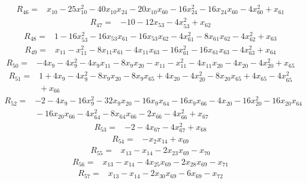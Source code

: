 \begin{align*}
R_{46}={}& x_{10} - 25x_{10}^{2} - 40x_{10}x_{24} - 20x_{10}x_{60} - 16x_{24}^{2} - 16x_{24}x_{60} - 4x_{60}^{2} + x_{61}
\end{align*}
\begin{align*}
R_{47}={}& -10 - 12x_{53} - 4x_{53}^{2} + x_{62}
\end{align*}
\begin{align*}
R_{48}={}& 1 - 16x_{53}^{2} - 16x_{53}x_{61} - 16x_{53}x_{62} - 4x_{61}^{2} - 8x_{61}x_{62} - 4x_{62}^{2} + x_{63}
\end{align*}
\begin{align*}
R_{49}={}& x_{11} - x_{11}^{2} - 8x_{11}x_{61} - 4x_{11}x_{63} - 16x_{61}^{2} - 16x_{61}x_{63} - 4x_{63}^{2} + x_{64}
\end{align*}
\begin{align*}
R_{50}={}& -4x_{9} - 4x_{9}^{2} - 4x_{9}x_{11} - 8x_{9}x_{20} - x_{11} - x_{11}^{2} - 4x_{11}x_{20} - 4x_{20} - 4x_{20}^{2} + x_{65}
\end{align*}
\begin{align*}
R_{51}={}& 1 + 4x_{9} - 4x_{9}^{2} - 8x_{9}x_{20} - 8x_{9}x_{65} + 4x_{20} - 4x_{20}^{2} - 8x_{20}x_{65} + 4x_{65} - 4x_{65}^{2} \\
&{} + x_{66}
\end{align*}
\begin{align*}
R_{52}={}& -2 - 4x_{9} - 16x_{9}^{2} - 32x_{9}x_{20} - 16x_{9}x_{64} - 16x_{9}x_{66} - 4x_{20} - 16x_{20}^{2} - 16x_{20}x_{64} \\
&{} - 16x_{20}x_{66} - 4x_{64}^{2} - 8x_{64}x_{66} - 2x_{66} - 4x_{66}^{2} + x_{67}
\end{align*}
\begin{align*}
R_{53}={}& -2 - 4x_{67} - 4x_{67}^{2} + x_{68}
\end{align*}
\begin{align*}
R_{54}={}& -x_{2}x_{14} + x_{69}
\end{align*}
\begin{align*}
R_{55}={}& x_{13} - x_{14} - 2x_{23}x_{69} - x_{70}
\end{align*}
\begin{align*}
R_{56}={}& x_{13} - x_{14} - 4x_{25}x_{69} - 2x_{28}x_{69} - x_{71}
\end{align*}
\begin{align*}
R_{57}={}& x_{13} - x_{14} - 2x_{30}x_{69} - 6x_{69} - x_{72}
\end{align*}
